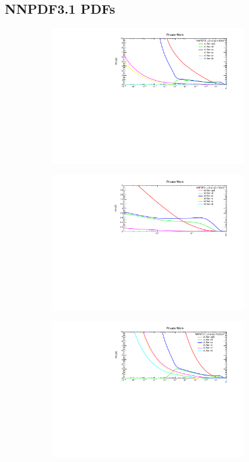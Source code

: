 \subsection{NNPDF3.1 PDFs}

\begin{figure}[H]
\centering
\begin{subfigure}{0.49\textwidth}
\includegraphics[height=6cm ,width=\textwidth]{chapter4/xfx10gev_lo.pdf}
\vspace*{-8mm}
\caption{}
\end{subfigure}
\begin{subfigure}{0.49\textwidth}
\includegraphics[height=6cm, width=\textwidth]{chapter4/xfx10gev_lo1.pdf}
\vspace*{-8mm}
\caption{}
\end{subfigure}
\begin{subfigure}{0.49\textwidth}
\includegraphics[height=6cm, width=\textwidth]{chapter4/xfx100gev_lo.pdf}

\end{subfigure}
\end{figure}
